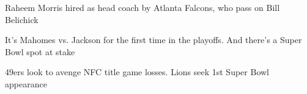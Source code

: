 Raheem Morris hired as head coach by Atlanta Falcons, who pass on Bill Belichick

\noindent It{\textquoteright}s Mahomes vs. Jackson for the first time in the playoffs. And there{\textquoteright}s a Super Bowl spot at stake

\noindent 49ers look to avenge NFC title game losses. Lions seek 1st Super Bowl appearance